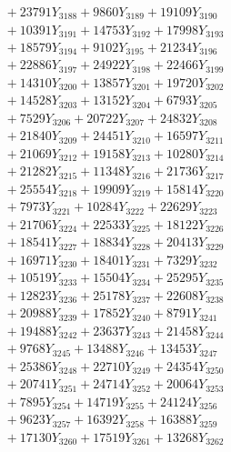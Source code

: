 \documentclass[a4paper,10pt]{article}
\begin{document}
{\begin{align}
&\;  + 23791 Y_{3188} + 9860 Y_{3189} + 19109 Y_{3190} \\[0.3ex]
&\;  + 10391 Y_{3191} + 14753 Y_{3192} + 17998 Y_{3193} \\[0.3ex]
&\;  + 18579 Y_{3194} + 9102 Y_{3195} + 21234 Y_{3196} \\[0.3ex]
&\;  + 22886 Y_{3197} + 24922 Y_{3198} + 22466 Y_{3199} \\[0.3ex]
&\;  + 14310 Y_{3200} + 13857 Y_{3201} + 19720 Y_{3202} \\[0.3ex]
&\;  + 14528 Y_{3203} + 13152 Y_{3204} + 6793 Y_{3205} \\[0.3ex]
&\;  + 7529 Y_{3206} + 20722 Y_{3207} + 24832 Y_{3208} \\[0.5ex]\allowbreak
&\;  + 21840 Y_{3209} + 24451 Y_{3210} + 16597 Y_{3211} \\[0.3ex]
&\;  + 21069 Y_{3212} + 19158 Y_{3213} + 10280 Y_{3214} \\[0.3ex]
&\;  + 21282 Y_{3215} + 11348 Y_{3216} + 21736 Y_{3217} \\[0.3ex]
&\;  + 25554 Y_{3218} + 19909 Y_{3219} + 15814 Y_{3220} \\[0.3ex]
&\;  + 7973 Y_{3221} + 10284 Y_{3222} + 22629 Y_{3223} \\[0.3ex]
&\;  + 21706 Y_{3224} + 22533 Y_{3225} + 18122 Y_{3226} \\[0.3ex]
&\;  + 18541 Y_{3227} + 18834 Y_{3228} + 20413 Y_{3229} \\[0.3ex]
&\;  + 16971 Y_{3230} + 18401 Y_{3231} + 7329 Y_{3232} \\[0.3ex]
&\;  + 10519 Y_{3233} + 15504 Y_{3234} + 25295 Y_{3235} \\[0.3ex]
&\;  + 12823 Y_{3236} + 25178 Y_{3237} + 22608 Y_{3238} \\[0.5ex]\allowbreak
&\;  + 20988 Y_{3239} + 17852 Y_{3240} + 8791 Y_{3241} \\[0.3ex]
&\;  + 19488 Y_{3242} + 23637 Y_{3243} + 21458 Y_{3244} \\[0.3ex]
&\;  + 9768 Y_{3245} + 13488 Y_{3246} + 13453 Y_{3247} \\[0.3ex]
&\;  + 25386 Y_{3248} + 22710 Y_{3249} + 24354 Y_{3250} \\[0.3ex]
&\;  + 20741 Y_{3251} + 24714 Y_{3252} + 20064 Y_{3253} \\[0.3ex]
&\;  + 7895 Y_{3254} + 14719 Y_{3255} + 24124 Y_{3256} \\[0.3ex]
&\;  + 9623 Y_{3257} + 16392 Y_{3258} + 16388 Y_{3259} \\[0.3ex]
&\;  + 17130 Y_{3260} + 17519 Y_{3261} + 13268 Y_{3262} \\[0.3ex]

\end{align}}
\end{document}
